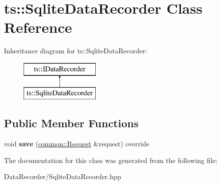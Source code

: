 \hypertarget{classts_1_1_sqlite_data_recorder}{}\section{ts\+:\+:Sqlite\+Data\+Recorder Class Reference}
\label{classts_1_1_sqlite_data_recorder}
Inheritance diagram for ts\+:\+:Sqlite\+Data\+Recorder\+:\begin{figure}[H]
\begin{center}
\leavevmode
\includegraphics[height=2.000000cm]{classts_1_1_sqlite_data_recorder}
\end{center}
\end{figure}
\subsection*{Public Member Functions}
\begin{DoxyCompactItemize}
\item 
\mbox{\label{classts_1_1_sqlite_data_recorder_a924730c2e5d94f237f58c0040297bc8b}} 
void {\bfseries save} (\hyperlink{structts_1_1common_1_1_request}{common\+::\+Request} \&request) override
\end{DoxyCompactItemize}


The documentation for this class was generated from the following file\+:\begin{DoxyCompactItemize}
\item 
Data\+Recorder/Sqlite\+Data\+Recorder.\+hpp\end{DoxyCompactItemize}
